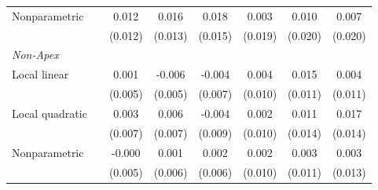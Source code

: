 {\begin{tabular}{ll*{6}{c}}
Nonparametric & & 0.012 & 0.016 & 0.018 & 0.003 & 0.010 & 0.007 \\
 & & (0.012) & (0.013) & (0.015) & (0.019) & (0.020) & (0.020) \\
\multicolumn{8}{l}{\textit{Non-Apex}}\\
Local linear & & 0.001 & -0.006 & -0.004 & 0.004 & 0.015 & 0.004 \\
 & & (0.005) & (0.005) & (0.007) & (0.010) & (0.011) & (0.011) \\
Local quadratic & & 0.003 & 0.006 & -0.004 & 0.002 & 0.011 & 0.017 \\
 & & (0.007) & (0.007) & (0.009) & (0.010) & (0.014) & (0.014) \\
Nonparametric & & -0.000 & 0.001 & 0.002 & 0.002 & 0.003 & 0.003 \\
 & & (0.005) & (0.006) & (0.006) & (0.010) & (0.011) & (0.013) \\
\bottomrule
\end{tabular}
}
